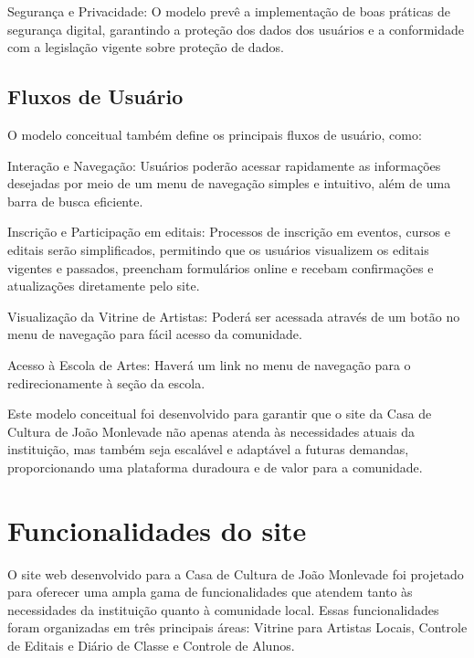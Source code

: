 Segurança e Privacidade: O modelo prevê a implementação de boas práticas de segurança digital, garantindo a proteção dos dados dos usuários e a conformidade com a legislação vigente sobre proteção de dados.

\subsection{Fluxos de Usuário}

O modelo conceitual também define os principais fluxos de usuário, como:

Interação e Navegação: Usuários poderão acessar rapidamente as informações desejadas por meio de um menu de navegação simples e intuitivo, além de uma barra de busca eficiente.

Inscrição e Participação em editais: Processos de inscrição em eventos, cursos e editais serão simplificados, permitindo que os usuários visualizem os editais vigentes e passados, preencham formulários online e recebam confirmações e atualizações diretamente pelo site.

Visualização da Vitrine de Artistas: Poderá ser acessada através de um botão no menu de navegação para fácil acesso da comunidade.

Acesso à Escola de Artes: Haverá um link no menu de navegação para o redirecionamente à seção da escola.

Este modelo conceitual foi desenvolvido para garantir que o site da Casa de Cultura de João Monlevade não apenas atenda às necessidades atuais da instituição, mas também seja escalável e adaptável a futuras demandas, proporcionando uma plataforma duradoura e de valor para a comunidade.

\section{Funcionalidades do site}

O site web desenvolvido para a Casa de Cultura de João Monlevade foi projetado para oferecer uma ampla gama de funcionalidades que atendem tanto às necessidades da instituição quanto à comunidade local. Essas funcionalidades foram organizadas em três principais áreas: Vitrine para Artistas Locais, Controle de Editais e Diário de Classe e Controle de Alunos.

